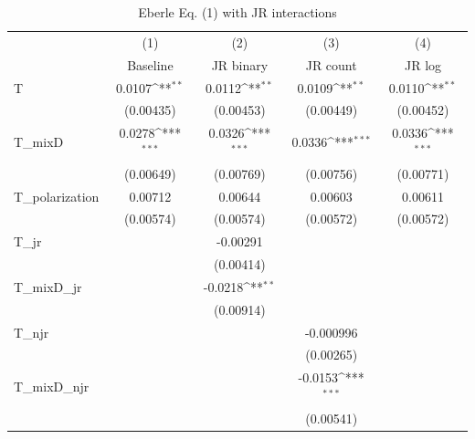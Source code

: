 \begin{table}[htbp]\centering
\def\sym#1{\ifmmode^{#1}\else\(^{#1}\)\fi}
\caption{Eberle Eq. (1) with JR interactions}
\begin{tabular}{l*{4}{c}}
\hline\hline
            &\multicolumn{1}{c}{(1)}&\multicolumn{1}{c}{(2)}&\multicolumn{1}{c}{(3)}&\multicolumn{1}{c}{(4)}\\
            &\multicolumn{1}{c}{Baseline}&\multicolumn{1}{c}{JR binary}&\multicolumn{1}{c}{JR count}&\multicolumn{1}{c}{JR log}\\
\hline
T           &      0.0107\sym{**} &      0.0112\sym{**} &      0.0109\sym{**} &      0.0110\sym{**} \\
            &   (0.00435)         &   (0.00453)         &   (0.00449)         &   (0.00452)         \\
[1em]
T\_mixD      &      0.0278\sym{***}&      0.0326\sym{***}&      0.0336\sym{***}&      0.0336\sym{***}\\
            &   (0.00649)         &   (0.00769)         &   (0.00756)         &   (0.00771)         \\
[1em]
T\_polarization&     0.00712         &     0.00644         &     0.00603         &     0.00611         \\
            &   (0.00574)         &   (0.00574)         &   (0.00572)         &   (0.00572)         \\
[1em]
T\_jr        &                     &    -0.00291         &                     &                     \\
            &                     &   (0.00414)         &                     &                     \\
[1em]
T\_mixD\_jr   &                     &     -0.0218\sym{**} &                     &                     \\
            &                     &   (0.00914)         &                     &                     \\
[1em]
T\_njr       &                     &                     &   -0.000996         &                     \\
            &                     &                     &   (0.00265)         &                     \\
[1em]
T\_mixD\_njr  &                     &                     &     -0.0153\sym{***}&                     \\
            &                     &                     &   (0.00541)         &                     \\

\end{tabular}
\end{table}
